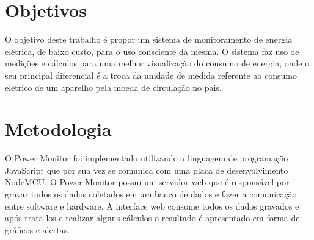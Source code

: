 \section{Objetivos}
O objetivo deste trabalho é propor um sistema de monitoramento de energia elétrica, de baixo custo, para o uso consciente da mesma. 
O sistema faz uso de medições e cálculos para uma melhor visualização do consumo de energia, onde o seu principal diferencial é a troca da unidade de medida 
referente ao consumo elétrico de um aparelho pela moeda de circulação no pais.




\section{Metodologia}
O Power Monitor foi implementado utilizando a linguagem de programação JavaScript que por sua vez se comunica com uma placa de desenvolvimento NodeMCU. 
O Power Monitor possui um servidor web que é responsável por gravar todos os dados coletados em um banco de dados e fazer a comunicação entre software e hardware. 
A interface web consome todos os dados gravados e após trata-los e realizar alguns cálculos o resultado é apresentado em forma de gráficos e alertas.

